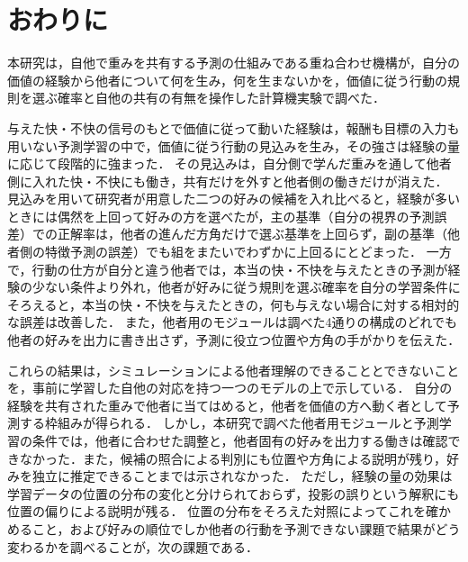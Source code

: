 \section{おわりに}\label{sec:conclusion}
本研究は，自他で重みを共有する予測の仕組みである重ね合わせ機構\cite{noguchi2022superposition}が，自分の価値の経験から他者について何を生み，何を生まないかを，価値に従う行動の規則を選ぶ確率と自他の共有の有無を操作した計算機実験で調べた．

与えた快・不快の信号のもとで価値に従って動いた経験は，報酬も目標の入力も用いない予測学習の中で，価値に従う行動の見込みを生み，その強さは経験の量に応じて段階的に強まった．
その見込みは，自分側で学んだ重みを通して他者側に入れた快・不快にも働き，共有だけを外すと他者側の働きだけが消えた．
見込みを用いて研究者が用意した二つの好みの候補を入れ比べると，経験が多いときには偶然を上回って好みの方を選べたが，主の基準（自分の視界の予測誤差）での正解率は，他者の進んだ方角だけで選ぶ基準を上回らず，副の基準（他者側の特徴予測の誤差）でも組をまたいでわずかに上回るにとどまった．
一方で，行動の仕方が自分と違う他者では，本当の快・不快を与えたときの予測が経験の少ない条件より外れ，他者が好みに従う規則を選ぶ確率を自分の学習条件にそろえると，本当の快・不快を与えたときの，何も与えない場合に対する相対的な誤差は改善した．
また，他者用のモジュールは調べた4通りの構成のどれでも他者の好みを出力に書き出さず，予測に役立つ位置や方角の手がかりを伝えた．

これらの結果は，シミュレーションによる他者理解のできることとできないことを，事前に学習した自他の対応を持つ一つのモデルの上で示している．
自分の経験を共有された重みで他者に当てはめると，他者を価値の方へ動く者として予測する枠組みが得られる．
しかし，本研究で調べた他者用モジュールと予測学習の条件では，他者に合わせた調整と，他者固有の好みを出力する働きは確認できなかった．また，候補の照合による判別にも位置や方角による説明が残り，好みを独立に推定できることまでは示されなかった．
ただし，経験の量の効果は学習データの位置の分布の変化と分けられておらず，投影の誤りという解釈にも位置の偏りによる説明が残る．
位置の分布をそろえた対照によってこれを確かめること，および好みの順位でしか他者の行動を予測できない課題で結果がどう変わるかを調べることが，次の課題である．